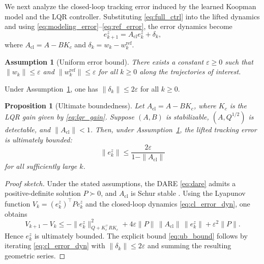 \documentclass[journal]{IEEEtran}
\newtheorem{assumption}{Assumption}
\newtheorem{proposition}{Proposition}
\begin{document}
We next analyze the closed-loop tracking error induced by the learned Koopman model and the LQR controller. Substituting \eqref{eq:full_ctrl} into the lifted dynamics and using \eqref{eq:modeling_error}--\eqref{eq:ref_error}, the error dynamics become
\begin{equation}
    e_{k+1}^z = A_{\mathrm{cl}} e_k^z + \delta_k,
    \label{eq:cl_error_dyn}
\end{equation}
where $A_{\mathrm{cl}} = A - BK_c$ and $\delta_k = w_k - w_k^{\mathrm{ref}}$.

\begin{assumption}[Uniform error bound]
\label{assump:bound}
There exists a constant $\varepsilon \geq 0$ such that $\|w_k\| \leq \varepsilon$ and $\|w_k^{\mathrm{ref}}\| \leq \varepsilon$ for all $k \geq 0$ along the trajectories of interest.
\end{assumption}

Under Assumption~\ref{assump:bound}, one has $\|\delta_k\| \leq 2\varepsilon$ for all $k \geq 0$.

\begin{proposition}[Ultimate boundedness]
\label{prop:ub}
Let $A_{\mathrm{cl}} = A - BK_c$, where $K_c$ is the LQR gain given by \eqref{eq:lqr_gain}. Suppose $(A,B)$ is stabilizable, $(A,Q^{1/2})$ is detectable, and $\|A_{\mathrm{cl}}\| < 1$. Then, under Assumption~\ref{assump:bound}, the lifted tracking error is ultimately bounded:
\begin{equation}
    \|e_k^z\| \leq \frac{2\varepsilon}{1 - \|A_{\mathrm{cl}}\|}
    \label{eq:ub_bound}
\end{equation}
for all sufficiently large $k$.
\end{proposition}

\begin{proof}[Proof sketch]
Under the stated assumptions, the DARE \eqref{eq:dare} admits a positive-definite solution $P \succ 0$, and $A_{\mathrm{cl}}$ is Schur stable \cite{korda2018linear}. Using the Lyapunov function $V_k = (e_k^z)^\top P e_k^z$ and the closed-loop dynamics \eqref{eq:cl_error_dyn}, one obtains
\begin{equation}
    V_{k+1} - V_k
    \leq
    -\|e_k^z\|_{Q+K_c^\top R K_c}^2
    + 4\varepsilon \|P\|\,\|A_{\mathrm{cl}}\|\,\|e_k^z\|
    + \varepsilon^2 \|P\|.
\end{equation}
Hence $e_k^z$ is ultimately bounded. The explicit bound \eqref{eq:ub_bound} follows by iterating \eqref{eq:cl_error_dyn} with $\|\delta_k\| \leq 2\varepsilon$ and summing the resulting geometric series.
\end{proof}
\end{document}
